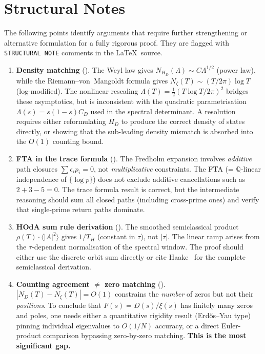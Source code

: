 \documentclass[11pt,a4paper]{article}
\theoremstyle{plain}
\theoremstyle{remark}
\newcommand{\Q}{\mathbb{Q}}
\begin{document}
\section{Structural Notes}\label{app:structural}

The following points identify arguments that require further strengthening
or alternative formulation for a fully rigorous proof.  They are flagged
with \texttt{STRUCTURAL NOTE} comments in the \LaTeX\ source.

\begin{enumerate}[label=\textbf{B\arabic*.},leftmargin=3em]

\item \textbf{Density matching} ().
  The Weyl law gives $N_{H_D}(\Lambda)\sim C\Lambda^{1/2}$ (power law),
  while the Riemann--von~Mangoldt formula gives
  $N_\zeta(T)\sim(T/2\pi)\log T$ (log-modified).  The nonlinear rescaling
  $\Lambda(T)=\tfrac{1}{2}(T\log T/2\pi)^2$ bridges these asymptotics,
  but is inconsistent with the quadratic parametrisation
  $\Lambda(s)=s(1-s)C_D$ used in the spectral determinant.  A resolution
  requires either reformulating $H_D$ to produce the correct density of
  states directly, or showing that the sub-leading density mismatch is
  absorbed into the $O(1)$ counting bound.

\item \textbf{FTA in the trace formula} ().
  The Fredholm expansion involves \emph{additive} path closures
  $\sum\epsilon_i p_i=0$, not \emph{multiplicative} constraints.
  The FTA (= $\Q$-linear independence of $\{\log p\}$) does not exclude
  additive cancellations such as $2+3-5=0$.  The trace formula result
  is correct, but the intermediate reasoning should sum all closed paths
  (including cross-prime ones) and verify that single-prime return paths
  dominate.

\item \textbf{HOdA sum rule derivation} ().
  The smoothed semiclassical product $\rho(T)\cdot\langle|A|^2\rangle$
  gives $1/T_H$ (constant in $\tau$), not $|\tau|$.  The linear ramp
  arises from the $\tau$-dependent normalisation of the spectral window.
  The proof should either use the discrete orbit sum directly or
  cite Haake~\cite{haake2010} for the complete semiclassical derivation.

\item \textbf{Counting agreement $\neq$ zero matching}
  ().
  $|N_D(T)-N_\xi(T)|=O(1)$ constrains the \emph{number} of zeros but
  not their \emph{positions}.  To conclude that $F(s)=D(s)/\xi(s)$ has
  finitely many zeros and poles, one needs either a quantitative
  rigidity result (Erd\H{o}s--Yau type) pinning individual eigenvalues
  to $O(1/N)$ accuracy, or a direct Euler-product comparison bypassing
  zero-by-zero matching.  \textbf{This is the most significant gap.}


\end{enumerate}
\end{document}

